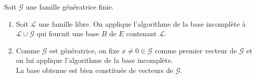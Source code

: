 \documentclass[../main.tex]{subfiles}
\begin{document}
\noindent Soit $\mathcal{G}$ une famille génératrice finie. 
\begin{enumerate}
    \item Soit $\mathcal{L}$ une famille libre. On applique l'algorithme de la base incomplète à $\mathcal{L} \cup \mathcal{G}$ qui fournit une base $B$ de $E$ contenant $\mathcal{L}$. 
    \item Comme $\mathcal{G}$ est génératrice, on fixe $x \neq 0 \in \mathcal{G}$ comme premier vecteur de $\mathcal{G}$ et on lui applique l'algorithme de la base incomplète. \\
    La base obtenue est bien constituée de vecteurs de $\mathcal{G}$. 
\end{enumerate}
\end{document}

